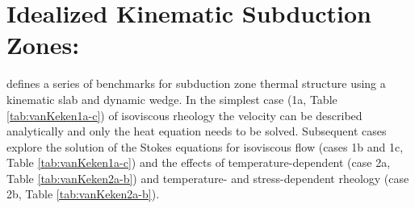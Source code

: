 %
%
%
%
%


\chapter{Idealized Kinematic Subduction Zones: \citeauthor{VanKekenPEPI2008}} \label{sec:vankeken}

\citet{VanKekenPEPI2008} defines a series of benchmarks for subduction
zone thermal structure using a kinematic slab and dynamic wedge. In
the simplest case (1a, Table \ref{tab:vanKeken1a-c}) of isoviscous rheology the velocity can be
described analytically and only the heat equation needs to be
solved. Subsequent cases explore the solution of the Stokes equations
for isoviscous flow (cases 1b and 1c, Table \ref{tab:vanKeken1a-c}) and the effects of
temperature-dependent (case 2a, Table \ref{tab:vanKeken2a-b}) and temperature- and stress-dependent
rheology (case 2b, Table \ref{tab:vanKeken2a-b}).



